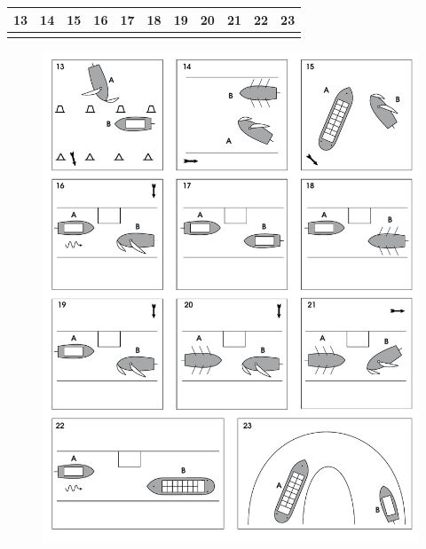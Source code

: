 \newpage
\begin{table}[h!]
	\centering
	\begin{tabular}{l|l|l|l|l|l|l|l|l|l|l}
		\textbf{13} & \textbf{14} & \textbf{15} & \textbf{16} & \textbf{17} & \textbf{18} & \textbf{19} & \textbf{20} & \textbf{21} & \textbf{22} & \textbf{23} \\ \hline
		\hspace{0.5 cm} & \hspace{0.5 cm}  & \hspace{0.5 cm} & \hspace{0.5 cm} & \hspace{0.5 cm} & \hspace{0.5 cm} & \hspace{0.5 cm} & \hspace{0.5 cm} & \hspace{0.5 cm} & \hspace{0.5 cm} & \hspace{0.5 cm}
	\end{tabular}
\end{table}
\begin{figure}[h!]
    \centering
    \includegraphics[width=\textwidth]{Hoofdstukken/Oefenvragen/pdf/regelementen_2.pdf}
\end{figure}
\newpage

